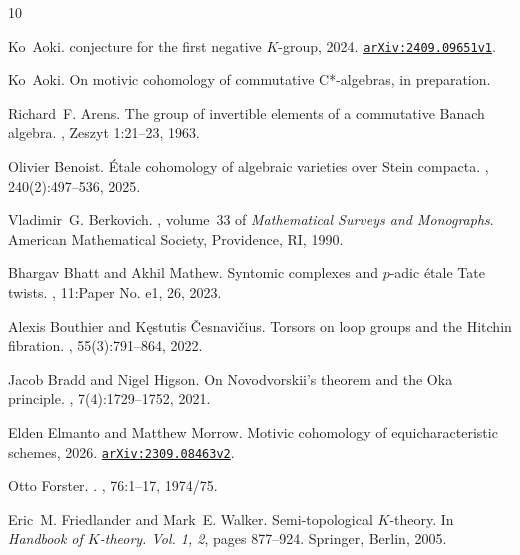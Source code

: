 \documentclass[11pt,a4paper]{amsart}
\numberwithin{equation}{section}
\theoremstyle{plain}
\theoremstyle{definition}
\theoremstyle{remark}
\let\oldSS\SS\let\SS\relax
\let\oldtop\top\let\top\relax
\newcommand{\SS}{\mathbf{S}}
\newcommand{\top}{\textnormal{top}}
\begin{document}

\let\SS\oldSS \let\top\oldtop  \newcommand{\yyyy}[1]{}
\begin{thebibliography}{10}

Ko~Aoki.
 conjecture for the first negative {$K$}-group, 2024.
\newblock \href{https://arxiv.org/abs/2409.09651v1}{\tt arXiv:2409.09651v1}.

Ko~Aoki.
\newblock On motivic cohomology of commutative {C*}-algebras, \yyyy{2026}in
  preparation.

Richard~F. Arens.
\newblock The group of invertible elements of a commutative {B}anach algebra.
, Zeszyt 1:21--23, 1963.

Olivier Benoist.
\newblock \'{E}tale cohomology of algebraic varieties over {S}tein compacta.
, 240(2):497--536, 2025.

Vladimir~G. Berkovich.
, volume~33 of {\em Mathematical Surveys and Monographs}.
\newblock American Mathematical Society, Providence, RI, 1990.

Bhargav Bhatt and Akhil Mathew.
\newblock Syntomic complexes and {$p$}-adic \'{e}tale {T}ate twists.
, 11:Paper No. e1, 26, 2023.

Alexis Bouthier and K\k{e}stutis \v{C}esnavi\v{c}ius.
\newblock Torsors on loop groups and the {H}itchin fibration.
, 55(3):791--864, 2022.

Jacob Bradd and Nigel Higson.
\newblock On {N}ovodvorskii's theorem and the {O}ka principle.
, 7(4):1729--1752, 2021.

Elden Elmanto and Matthew Morrow.
\newblock Motivic cohomology of equicharacteristic schemes, 2026.
\newblock \href{https://arxiv.org/abs/2309.08463v2}{\tt arXiv:2309.08463v2}.

Otto Forster.
.
, 76:1--17, 1974/75.

Eric~M. Friedlander and Mark~E. Walker.
\newblock Semi-topological {$K$}-theory.
\newblock In {\em Handbook of {$K$}-theory. {V}ol. 1, 2}, pages 877--924.
  Springer, Berlin, 2005.


\end{thebibliography}
\end{document}
